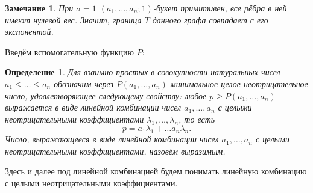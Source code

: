\documentclass[12pt]{article}
\newtheorem{definition}[theorem]{Определение}
\newtheorem{remark}[theorem]{Замечание}
\begin{document}
\begin{remark}
\label{rmrk:expAndT}
При $\sigma = 1$ $(a_1, \dots, a_n; 1)$-букет примитивен, все рёбра в ней имеют нулевой вес. Значит, граница $T$ данного графа совпадает с его экспонентой.
\end{remark}

Введём вспомогательную функцию $P$:
\begin{definition}
Для взаимно простых в совокупности натуральных чисел $a_1 \le \dots \le a_n$ обозначим через $P(a_1, \dots, a_n)$ минимальное целое неотрицательное число, удовлетворяющее следующему свойству: любое $p \ge P(a_1, \dots, a_n)$ выражается в виде линейной комбинации чисел $a_1, \dots, a_n$ с целыми неотрицательными коэффициентами $\lambda_1, \dots, \lambda_n$, то есть
\begin{equation}
\label{LK}
p = a_1 \lambda_1 + \dots a_n \lambda_n.
\end{equation}
Число, выражающееся в виде линейной комбинации чисел $a_1, \dots, a_n$ с целыми \\ неотрицательными коэффициентами, назовём выразимым.
\end{definition}

Здесь и далее под линейной комбинацией будем понимать линейную комбинацию с целыми неотрицательными коэффициентами.
\end{document}
